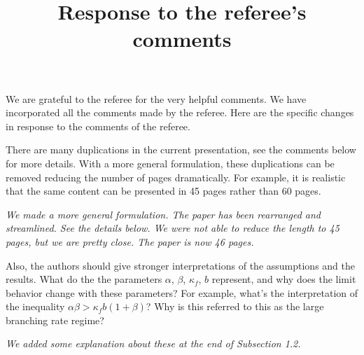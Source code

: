 \documentclass[12pt,a4paper]{amsart}
\title[Response]{\large Response to the referee's comments}
\begin{document}
\maketitle	
	We are grateful to the referee for the very helpful comments.
We have incorporated all the comments made by the referee.
Here are the specific changes in response to the comments of the referee.


There are many duplications in the current presentation, see the comments below for more details.
With a more general formulation, these duplications can be removed reducing the number of pages
dramatically. For example, it is realistic that the same content can be presented in 45 pages rather
than 60 pages.

\emph{We made a more general formulation. The paper has been rearranged and streamlined.
See the details below. We were not able to reduce the length to 45 pages, but we are pretty close. The paper is now 46 pages.}

Also, the authors should give stronger interpretations of the assumptions and the results. What
do the the parameters $\alpha$, $\beta$, $\kappa_f$, $b$ represent, and why does the limit behavior change with these
parameters? For example, what's the interpretation of the inequality $\alpha\beta > \kappa_f b(1 + \beta)$? Why is
this referred to this as the large branching rate regime?

\emph{We added some explanation about these at the end of Subsection 1.2.}
\end{document}
